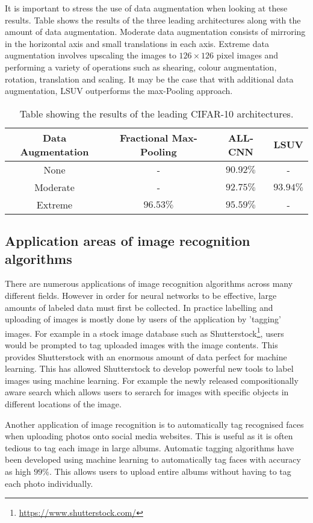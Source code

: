It is important to stress the use of data augmentation when looking at these results. Table \label{tab:SOA_res} shows the results of the three leading architectures along with the amount of data augmentation. Moderate data augmentation consists of mirroring in the horizontal axis and small translations in each axis. Extreme data augmentation involves upscaling the images to $126\times126$ pixel images and performing a variety of operations such as shearing, colour augmentation, rotation, translation and scaling. It may be the case that with additional data augmentation, LSUV outperforms the max-Pooling approach.

\begin{table}[h]
\begin{center}
 \begin{tabular}{||c || c c c||}
 \hline
 Data Augmentation & Fractional Max-Pooling & ALL-CNN & LSUV \\ [0.5ex]
 \hline\hline
 None & - & $90.92\%$ & - \\
 \hline
 Moderate & - & $92.75\%$ & $93.94\%$\\
 \hline
 Extreme & $96.53\%$ & $95.59\%$ & - \\ [1ex]
 \hline

\end{tabular}
\caption{Table showing the results of the leading CIFAR-10 architectures.}
\end{center}
\end{table}


\subsection{Application areas of image recognition algorithms}

There are numerous applications of image recognition algorithms across many different fields. However in order for neural networks to be effective, large amounts of labeled data must first be collected. In practice labelling and uploading of images is mostly done by users of the application by 'tagging' images. For example in a stock image database such as Shutterstock\footnote{\url{https://www.shutterstock.com/}}, users would be prompted to tag uploaded images with the image contents. This provides Shutterstock with an enormous amount of data perfect for machine learning. This has allowed Shutterstock to develop powerful new tools to label images using machine learning. For example the newly released compositionally aware search which allows users to serarch for images with specific objects in different locations of the image\cite{ranzingercomposition}.

Another application of image recognition is to automatically tag recognised faces when uploading photos onto social media websites. This is useful as it is often tedious to tag each image in large albums. Automatic tagging algorithms have been developed using machine learning to automatically tag faces with accuracy as high $99\%$\cite{schroff2015facenet}. This allows users to upload entire albums without having to tag each photo individually.
